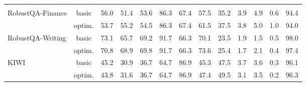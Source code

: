 \begin{table}[h]
{\begin{tabular}{lcccccccccccc}
\rowcolor{Blue}
\multicolumn{13}{c}{\textbf{E5-Mistral + Llama3 70B}} \\
\multirow{2}{*}{RobustQA-Finance} & basic & 56.0 & 51.4 & 53.6 & 86.3 & 67.4 & 57.5 & 35.2 & 3.9 & 4.9 & 0.6 & 94.4 \\
 & optim. & 53.7 & 55.2 & 54.5 & 86.3 & 67.4 & 61.5 & 37.5 & 3.8 & 5.0 & 1.0 & 94.0 \\
\multirow{2}{*}{RobustQA-Writing} & basic & 73.1 & 65.7 & 69.2 & 91.7 & 66.3 & 70.1 & 23.5 & 1.9 & 1.5 & 0.5 & 98.0 \\
 & optim. & 70.8 & 68.9 & 69.8 & 91.7 & 66.3 & 73.6 & 25.4 & 1.7 & 2.1 & 0.4 & 97.4 \\
\multirow{2}{*}{KIWI} & basic & 45.2 & 30.9 & 36.7 & 64.7 & 86.9 & 45.3 & 47.5 & 3.7 & 3.6 & 0.3 & 96.1 \\
 & optim. & 43.8 & 31.6 & 36.7 & 64.7 & 86.9 & 47.4 & 49.5 & 3.1 & 3.5 & 0.2 & 96.3 \\
\bottomrule
\end{tabular}
}
\end{table}